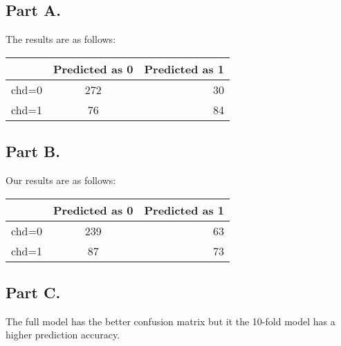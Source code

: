\documentclass{article}
\begin{document}
\subsection*{Part A.}
The results are as follows:
\begin{tabular}{|l|c|r|}
  \hline
  & Predicted as 0 & Predicted as 1 \\
  \hline
  chd=0 & 272 & 30\\
  \hline
  chd=1 & 76 & 84\\
  \hline
\end{tabular}
\subsection*{Part B.}
Our results are as follows:

    \begin{tabular}{|l|c|r|}
      \hline
      & Predicted as 0 & Predicted as 1 \\
      \hline
      chd=0 & 239 & 63\\
      \hline
      chd=1 & 87 & 73\\
      \hline
    \end{tabular}

\subsection*{Part C.}
The full model has the better confusion matrix but it the 10-fold model has a higher prediction accuracy.
\end{document}
